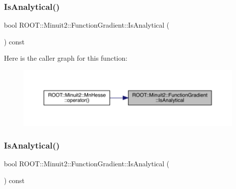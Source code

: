 \mbox{\label{classROOT_1_1Minuit2_1_1FunctionGradient_a34dd6c6a7d699a149edfbb3328c525db}} 
\subsubsection{\texorpdfstring{IsAnalytical()}{IsAnalytical()}\hspace{0.1cm}{\footnotesize\ttfamily [1/3]}}
{\footnotesize\ttfamily bool R\+O\+O\+T\+::\+Minuit2\+::\+Function\+Gradient\+::\+Is\+Analytical (\begin{DoxyParamCaption}{ }\end{DoxyParamCaption}) const\hspace{0.3cm}{\ttfamily [inline]}}

Here is the caller graph for this function\+:
\nopagebreak
\begin{figure}[H]
\begin{center}
\leavevmode
\includegraphics[width=350pt]{d3/d48/classROOT_1_1Minuit2_1_1FunctionGradient_a34dd6c6a7d699a149edfbb3328c525db_icgraph}
\end{center}
\end{figure}
\mbox{\label{classROOT_1_1Minuit2_1_1FunctionGradient_a34dd6c6a7d699a149edfbb3328c525db}} 
\subsubsection{\texorpdfstring{IsAnalytical()}{IsAnalytical()}\hspace{0.1cm}{\footnotesize\ttfamily [2/3]}}
{\footnotesize\ttfamily bool R\+O\+O\+T\+::\+Minuit2\+::\+Function\+Gradient\+::\+Is\+Analytical (\begin{DoxyParamCaption}{ }\end{DoxyParamCaption}) const\hspace{0.3cm}{\ttfamily [inline]}}


